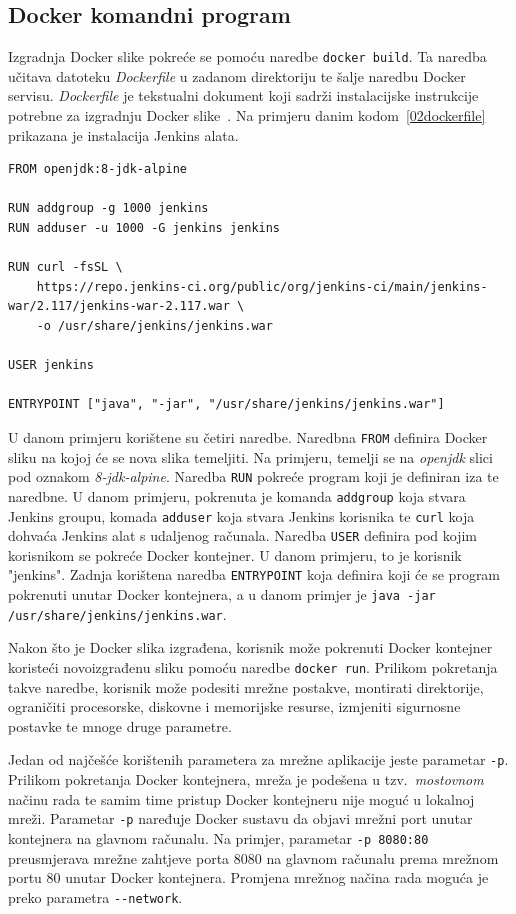 \subsection{Docker komandni program}
Izgradnja Docker slike pokreće se pomoću naredbe \texttt{docker~build}. Ta naredba učitava datoteku
\textit{Dockerfile} u zadanom direktoriju te šalje naredbu Docker servisu. \textit{Dockerfile} je
tekstualni dokument koji sadrži instalacijske instrukcije potrebne za izgradnju Docker
slike~\citep{kacamarga2015lightweight}. Na primjeru danim kodom~\ref{02dockerfile} prikazana je
instalacija Jenkins alata.

\begin{lstlisting}[float=h]
FROM openjdk:8-jdk-alpine

RUN addgroup -g 1000 jenkins
RUN adduser -u 1000 -G jenkins jenkins

RUN curl -fsSL \
    https://repo.jenkins-ci.org/public/org/jenkins-ci/main/jenkins-war/2.117/jenkins-war-2.117.war \
    -o /usr/share/jenkins/jenkins.war

USER jenkins

ENTRYPOINT ["java", "-jar", "/usr/share/jenkins/jenkins.war"]
\end{lstlisting}

U danom primjeru korištene su četiri naredbe. Naredbna \texttt{FROM} definira Docker sliku na kojoj
će se nova slika temeljiti. Na primjeru, temelji se na \textit{openjdk} slici pod oznakom
\textit{8-jdk-alpine}. Naredba \texttt{RUN} pokreće program koji je definiran iza te naredbne. U
danom primjeru, pokrenuta je komanda \texttt{addgroup} koja stvara Jenkins groupu, komada
\texttt{adduser} koja stvara Jenkins korisnika te \texttt{curl} koja dohvaća Jenkins alat s
udaljenog računala.  Naredba \texttt{USER} definira pod kojim korisnikom se pokreće Docker
kontejner. U danom primjeru, to je korisnik "jenkins". Zadnja korištena naredba \texttt{ENTRYPOINT}
koja definira koji će se program pokrenuti unutar Docker kontejnera, a u danom primjer je
\texttt{java -jar /usr/share/jenkins/jenkins.war}.

Nakon što je Docker slika izgrađena, korisnik može pokrenuti Docker kontejner koristeći
novoizgrađenu sliku pomoću naredbe \texttt{docker~run}. Prilikom pokretanja takve naredbe, korisnik
može podesiti mrežne postakve, montirati direktorije, ograničiti procesorske, diskovne i memorijske
resurse, izmjeniti sigurnosne postavke te mnoge druge parametre.

Jedan od najčešće korištenih parametera za mrežne aplikacije jeste parametar \texttt{-p}. Prilikom
pokretanja Docker kontejnera, mreža je podešena u tzv.~\textit{mostovnom} načinu rada te samim time
pristup Docker kontejneru nije moguć u lokalnoj mreži. Parametar \texttt{-p} naređuje Docker sustavu
da objavi mrežni port unutar kontejnera na glavnom računalu. Na primjer, parametar \texttt{-p
8080:80} preusmjerava mrežne zahtjeve porta 8080 na glavnom računalu prema mrežnom portu 80 unutar
Docker kontejnera. Promjena mrežnog načina rada moguća je preko parametra \texttt{-{}-network}.

